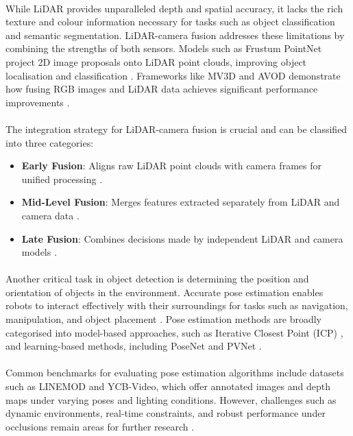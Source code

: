 \paragraph*{} 
While LiDAR provides unparalleled depth and spatial accuracy, it lacks the rich texture and colour information necessary for tasks such as object classification and semantic segmentation. LiDAR-camera fusion addresses these limitations by combining the strengths of both sensors. Models such as Frustum PointNet project 2D image proposals onto LiDAR point clouds, improving object localisation and classification \cite{qi2018frustumpointnet}. Frameworks like MV3D and AVOD demonstrate how fusing RGB images and LiDAR data achieves significant performance improvements \cite{ku2018mv3d}.

\paragraph*{} 
The integration strategy for LiDAR-camera fusion is crucial and can be classified into three categories:

\begin{itemize}
    \item \textbf{Early Fusion}: Aligns raw LiDAR point clouds with camera frames for unified processing \cite{ku2018mv3d}.
    \item \textbf{Mid-Level Fusion}: Merges features extracted separately from LiDAR and camera data \cite{chen2017avod}.
    \item \textbf{Late Fusion}: Combines decisions made by independent LiDAR and camera models \cite{qi2018frustumpointnet}.
\end{itemize}

\paragraph*{} 
Another critical task in object detection is determining the position and orientation of objects in the environment. Accurate pose estimation enables robots to interact effectively with their surroundings for tasks such as navigation, manipulation, and object placement \cite{paul2021object}. Pose estimation methods are broadly categorised into model-based approaches, such as Iterative Closest Point (ICP) \cite{yuan2023accurate}, and learning-based methods, including PoseNet \cite{kendall2015posenet} and PVNet \cite{peng2019pvnet}.

\paragraph*{} 
Common benchmarks for evaluating pose estimation algorithms include datasets such as LINEMOD and YCB-Video, which offer annotated images and depth maps under varying poses and lighting conditions. However, challenges such as dynamic environments, real-time constraints, and robust performance under occlusions remain areas for further research \cite{chen2022occlusion}.

